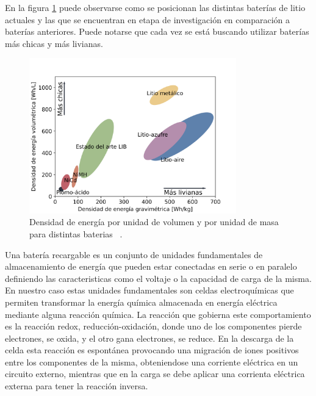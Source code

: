En la figura \ref{fig:densidad} puede observarse como se posicionan las distintas
baterías de litio actuales y las que se encuentran en etapa de investigación
en comparación a baterías anteriores. Puede notarse que cada vez se está buscando
utilizar baterías más chicas y más livianas.
\begin{figure}
    \centering
    \includegraphics[width=0.8\textwidth]{introduccion/baterias/densidad_de_energia.png}
    \caption{Densidad de energía por unidad de volumen y por unidad de masa para 
    distintas baterias ~\cite{tarascon2011, placke2017}.}
    \label{fig:densidad}
\end{figure}

Una batería recargable es un conjunto de unidades fundamentales de almacenamiento
de energía que pueden estar conectadas en serie o en paralelo definiendo las 
caracteristicas como el voltaje o la capacidad de carga de la misma. En nuestro 
caso estas unidades fundamentales son celdas electroquímicas que permiten 
transformar la energía química almacenada en energía eléctrica mediante alguna 
reacción química. La reacción que gobierna este comportamiento es la reacción 
redox, reducción-oxidación, donde uno de los componentes pierde electrones, se 
oxida, y el otro gana electrones, se reduce. En la descarga de la celda esta 
reacción es espontánea provocando una migración de iones positivos entre los 
componentes de la misma, obteniendose una corriente eléctrica en un circuito 
externo, mientras que en la carga se debe aplicar una corrienta eléctrica externa
para tener la reacción inversa.

